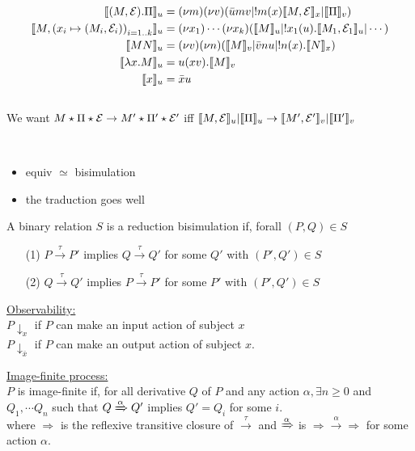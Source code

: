 \documentclass[a4paper,12pt]{book}
\begin{document}
\begin{align*}
\llbracket (M,\mathcal{E}).\Pi \rrbracket_u &= (\nu m)(\nu v)(\bar{u}mv|!m(x)\llbracket M,\mathcal{E}\rrbracket_x|\llbracket\Pi\rrbracket_v)\\
\llbracket M,\left( x_i\mapsto(M_i,\mathcal{E}_i)\right)_{i=1..k}\rrbracket_u &= (\nu x_1)\cdots(\nu x_k)(\llbracket M\rrbracket_u|!x_1(u).\llbracket M_1,\mathcal{E}_1\rrbracket_u | \cdots)\\
\llbracket MN \rrbracket_u &= (\nu v) (\nu n) (\llbracket M \rrbracket_v | \bar{v}nu|!n(x).\llbracket N\rrbracket_x)\\
\llbracket\lambda x.M\rrbracket_u &= u (xv).\llbracket M\rrbracket_v\\
\llbracket x\rrbracket_u &= \bar{x}u
\end{align*}
~\\
We want $M\star\Pi\star\mathcal{E}\rightarrow M'\star\Pi'\star\mathcal{E}'$ iff $\llbracket M,\mathcal{E}\rrbracket_u|\llbracket\Pi\rrbracket_u\rightarrow\llbracket M',\mathcal{E}'\rrbracket_v|\llbracket\Pi'\rrbracket_v$

~\\

\begin{itemize}
	\item equiv $\simeq$ bisimulation
	\item the traduction goes well
\end{itemize}
\newpage
\begin{definition}
A binary relation $S$ is a reduction bisimulation if, forall $(P,Q)\in S$\\
\begin{itemize}
	\item[(1)] $P\xrightarrow{\tau}P'$ implies $Q\xrightarrow{\tau}Q'$ for some $Q'$ with $(P',Q')\in S$
	\item[(2)] $Q\xrightarrow{\tau}Q'$ implies $P\xrightarrow{\tau}P'$ for some $P'$ with $(P',Q')\in S$
\end{itemize}
\end{definition}

\noindent\hrulefill

\noindent\underline{Observability:}\\
$P\downarrow_{x}$ if $P$ can make an input action of subject $x$\\
$P\downarrow_{\bar{x}}$ if $P$ can make an output action of subject $x$.

\noindent\hrulefill

\noindent\underline{Image-finite process:}\\
$P$ is image-finite if, for all derivative $Q$ of $P$ and any action $\alpha, \exists n\geq0$ and $Q_1,\cdots Q_n$ such that $Q\xRightarrow{\alpha}Q'$ implies $Q'=Q_i$ for some $i$.\\
\;\;\;where $\Rightarrow$ is the reflexive transitive closure of $\xrightarrow{\tau}$ and $\xRightarrow{\alpha}$ is $\Rightarrow\xrightarrow{\alpha}\Rightarrow$ for some action $\alpha$.
\end{document}
